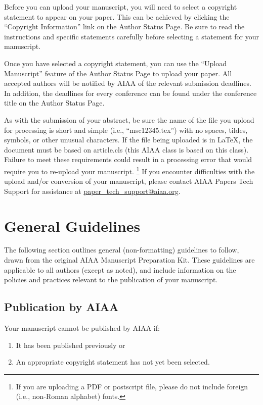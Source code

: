 \documentclass{aiaa-tc}%
\newcommand{\cls}[1]{\textsf{#1}}
\begin{document}
Before you can upload your manuscript, you will need to select a
copyright statement to appear on your paper.
This can be achieved by clicking the ``Copyright Information'' link on
the Author Status Page.
Be sure to read the instructions and specific statements carefully
before selecting a statement for your manuscript.

Once you have selected a copyright statement, you can use the ``Upload
Manuscript'' feature of the Author Status Page to upload your paper.
All accepted authors will be notified by AIAA of the relevant
submission deadlines.
In addition, the deadlines for every conference can be found under the
conference title on the Author Status Page.

As with the submission of your abstract, be sure the name of the file
you upload for processing is short and simple (i.e., ``msc12345.tex'')
with no spaces, tildes, symbols, or other unusual characters.
If the file being uploaded is in \LaTeX, the document must be based
on \cls{article.cls} (this AIAA class is based on this class).
Failure to meet these requirements could result in a processing error
that would require you to re-upload your manuscript.%
\footnote{If you are uploading a PDF or postscript file, please do not
  include foreign (i.e., non-Roman alphabet) fonts.}
If you encounter difficulties with the upload and/or conversion of your
manuscript, please contact AIAA Papers Tech Support for assistance at
\href{mailto:paper_tech_support@aiaa.org?subject=upload}%
     {paper\_tech\_support@aiaa.org}.

\section{General Guidelines}

The following section outlines general (non-formatting) guidelines to
follow, drawn from the original AIAA Manuscript Preparation Kit.
These guidelines are applicable to all authors (except as noted), and
include information on the policies and practices relevant to the
publication of your manuscript.

\subsection{Publication by AIAA}

Your manuscript cannot be published by AIAA if:
\begin{enumerate}
 \item It has been published previously or
 \item An appropriate copyright statement has not yet been selected.
\end{enumerate}
\end{document}

